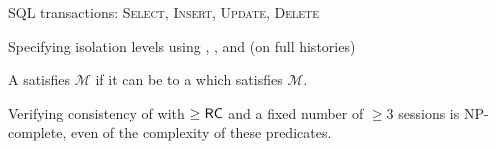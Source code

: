 
\begin{frame}{}
	\begin{center}

		\vspace{0.50cm}
		SQL transactions: \textsc{Select, Insert, Update, Delete}

		\pause
		\vspace{0.50cm}
	\end{center}
\end{frame}

\begin{frame}{}
	\begin{center}

		\begin{center}
		\end{center}

		\pause
	\end{center}
\end{frame}

\begin{frame}{}
	\begin{center}
		Specifying isolation levels
		using \textsf{}, \textsf{}, and \textsf{}
		(on full histories)
	\end{center}
\end{frame}

\begin{frame}{}
	\begin{definition}
		A  satisfies $\mathcal{M}$
		if it can be  to a  which satisfies $\mathcal{M}$.
	\end{definition}


	\begin{theorem}
		Verifying consistency of 
		with $\ge \textsf{RC}$ and a fixed number of $\ge 3$ sessions
		is \textsf{NP-complete},
		even  of the complexity of these predicates.
	\end{theorem}
\end{frame}

